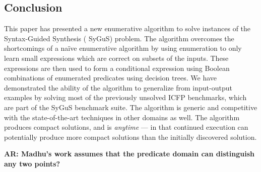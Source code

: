 \documentclass{llncs}
\newcommand\comment[1]{}
\newcommand\arsays[1]{{\bf AR: #1}}
\newcommand\tuple[1]{\langle #1 \rangle}
\newcommand\Grammar{G}
\newcommand\sem[1]{[\![ #1 ]\!]}
\newcommand\DecisionTree{\mathit{DT}}
\newcommand\NodesInternal{V_I}
\newcommand\Nodes{V}
\newcommand\node{v}
\newcommand\NodesLeaf{V_L}
\newcommand\EdgesYes{E_Y}
\newcommand\EdgesNo{E_N}
\newcommand\Edges{E}
\newcommand\Attribute{\mathcal{A}}
\newcommand\Label{\mathcal{L}}
\newcommand{\sygus}{{\sffamily\fontsize{8.5}{10}\selectfont
    SyGuS}\xspace}
\begin{document}
\subsection{Conclusion}
This paper has presented a new enumerative algorithm to solve
instances of the Syntax-Guided Synthesis (\sygus) problem. The
algorithm overcomes the shortcomings of a na\"ive enumerative
algorithm by using enumeration to only learn small expressions which
are correct on subsets of the inputs. These expressions are then used
to form a conditional expression using Boolean combinations of
enumerated predicates using decision trees. We have demonstrated the
ability of the algorithm to generalize from input-output examples by
solving most of the previously unsolved ICFP benchmarks, which are
part of the \sygus benchmark suite. The algorithm is generic and
competitive with the state-of-the-art techniques in other domains as
well. The algorithm produces compact solutions, and is \emph{anytime}
--- in that continued execution can potentially produce more compact
solutions than the initially discovered solution.



\setlength{\bibsep}{1pt}
\begin{small}

\end{small}

\arsays{Madhu's work assumes that the predicate domain can distinguish
any two points?}

\comment{
Formally, a {\em decision tree} $\DecisionTree$  is a tuple $\tuple{
\Nodes, (\NodesInternal, \NodesLeaf), \node_0, \Edges, (\EdgesYes,
\EdgesNo), \Attribute, \Label }$ where:
\begin{inparaenum}[(a)]
\item $(\Nodes, \Edges)$ form a rooted binary tree with root node
    $\node_0 \in \Nodes$;
\item The nodes $\Nodes$ are partitioned into a set of internal nodes
    $\NodesInternal$ and leaf nodes $\NodesLeaf$;
\item The attribute function $\Attribute : \NodesInternal \to
    \sem{\Grammar_P}$ maps internal nodes to predicates;
\item The label function $\Label : \NodesLeaf \to \sem{\Grammar_T}$ maps
    leaf nodes to terms;
\item The edges $\Edges$ are partitioned into positive edges $\EdgesYes$
  and negative edges $\EdgesNo$ with each internal node being the source
  of one positive and one negative edge.
  We denote the children of an internal node connected through a
  positive (resp. negative) edge the left (resp. right) child.
\end{inparaenum}
}
\end{document}
